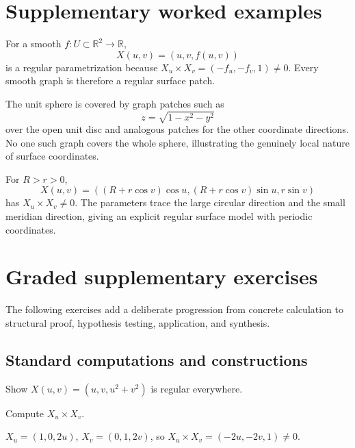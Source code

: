 \section{Supplementary worked examples}
\label{sec:vii14-pedagogy}

\begin{example}\label{ex:vii14-ped-01}
For a smooth \(f:U\subset\mathbb R^2\to\mathbb R\),
\[
X(u,v)=(u,v,f(u,v))
\]
is a regular parametrization because \(X_u\times X_v=(-f_u,-f_v,1)\neq0\).  Every smooth graph is therefore a regular surface patch.
\end{example}

\begin{example}\label{ex:vii14-ped-02}
The unit sphere is covered by graph patches such as
\[
z=\sqrt{1-x^2-y^2}
\]
over the open unit disc and analogous patches for the other coordinate directions.  No one such graph covers the whole sphere, illustrating the genuinely local nature of surface coordinates.
\end{example}

\begin{example}\label{ex:vii14-ped-03}
For \(R>r>0\),
\[
X(u,v)=((R+r\cos v)\cos u,(R+r\cos v)\sin u,r\sin v)
\]
has \(X_u\times X_v\neq0\).  The parameters trace the large circular direction and the small meridian direction, giving an explicit regular surface model with periodic coordinates.
\end{example}

\section{Graded supplementary exercises}
The following exercises add a deliberate progression from concrete calculation to structural proof, hypothesis testing, application, and synthesis.

\subsection*{Standard computations and constructions}

\begin{exercise}\label{exr:vii14-ped-01}
Show \(X(u,v)=(u,v,u^2+v^2)\) is regular everywhere.
\end{exercise}
\begin{hint}
Compute \(X_u\times X_v\).
\end{hint}
\begin{solution}
\(X_u=(1,0,2u)\), \(X_v=(0,1,2v)\), so \(X_u\times X_v=(-2u,-2v,1)\neq0\).
\end{solution}

